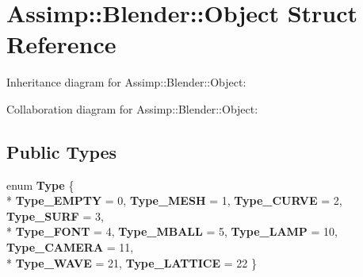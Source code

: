 \hypertarget{struct_assimp_1_1_blender_1_1_object}{\section{Assimp\+:\+:Blender\+:\+:Object Struct Reference}
\label{struct_assimp_1_1_blender_1_1_object}
}


Inheritance diagram for Assimp\+:\+:Blender\+:\+:Object\+:


Collaboration diagram for Assimp\+:\+:Blender\+:\+:Object\+:
\subsection*{Public Types}
\begin{DoxyCompactItemize}
\item 
\hypertarget{struct_assimp_1_1_blender_1_1_object_a0e71fa51850e0be0e4a1e1051f90b007}{enum {\bfseries Type} \{ \\*
{\bfseries Type\+\_\+\+E\+M\+P\+T\+Y} = 0, 
{\bfseries Type\+\_\+\+M\+E\+S\+H} = 1, 
{\bfseries Type\+\_\+\+C\+U\+R\+V\+E} = 2, 
{\bfseries Type\+\_\+\+S\+U\+R\+F} = 3, 
\\*
{\bfseries Type\+\_\+\+F\+O\+N\+T} = 4, 
{\bfseries Type\+\_\+\+M\+B\+A\+L\+L} = 5, 
{\bfseries Type\+\_\+\+L\+A\+M\+P} = 10, 
{\bfseries Type\+\_\+\+C\+A\+M\+E\+R\+A} = 11, 
\\*
{\bfseries Type\+\_\+\+W\+A\+V\+E} = 21, 
{\bfseries Type\+\_\+\+L\+A\+T\+T\+I\+C\+E} = 22
 \}}\label{struct_assimp_1_1_blender_1_1_object_a0e71fa51850e0be0e4a1e1051f90b007}

\end{DoxyCompactItemize}
